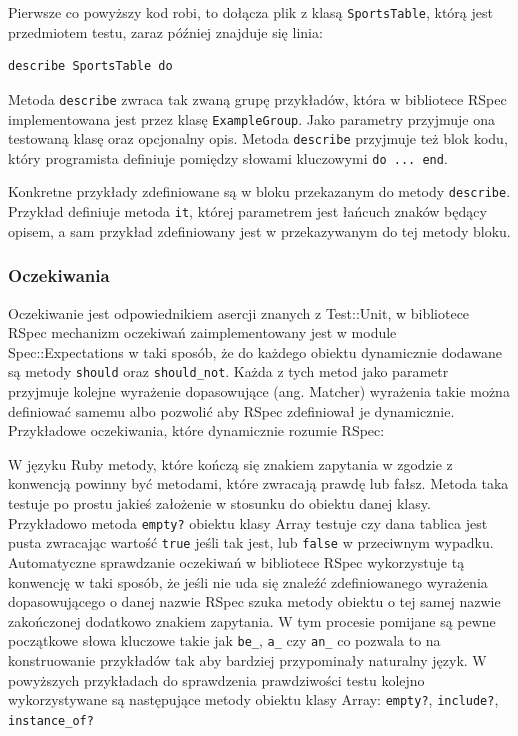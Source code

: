     
    
    Pierwsze co powyższy kod robi, to dołącza plik z klasą \texttt{SportsTable}, którą jest przedmiotem testu, zaraz później znajduje się linia:
    
\begin{lstlisting}
describe SportsTable do
\end{lstlisting}
    
    Metoda \texttt{describe} zwraca tak zwaną grupę przykładów, która w bibliotece RSpec implementowana jest przez klasę \texttt{ExampleGroup}. Jako parametry przyjmuje ona testowaną klasę oraz opcjonalny opis. Metoda \texttt{describe} przyjmuje też blok kodu, który programista definiuje pomiędzy słowami kluczowymi \texttt{do ... end}.
    
    Konkretne przykłady zdefiniowane są w bloku przekazanym do metody \texttt{describe}. Przykład definiuje metoda \texttt{it}, której parametrem jest łańcuch znaków będący opisem, a sam przykład zdefiniowany jest w przekazywanym do tej metody bloku.
    
    \subsubsection{Oczekiwania}
    Oczekiwanie jest odpowiednikiem asercji znanych z Test::Unit, w bibliotece RSpec mechanizm oczekiwań zaimplementowany jest w module Spec::Expectations w taki sposób, że do każdego obiektu dynamicznie dodawane są metody \texttt{should} oraz \texttt{should\_not}. Każda z tych metod jako parametr przyjmuje kolejne wyrażenie dopasowujące (ang. Matcher) wyrażenia takie można definiować samemu albo pozwolić aby RSpec zdefiniował je dynamicznie. Przykładowe oczekiwania, które dynamicznie rozumie RSpec:
    
    
    
    W języku Ruby metody, które kończą się znakiem zapytania w zgodzie z konwencją powinny być metodami, które zwracają prawdę lub fałsz. Metoda taka testuje po prostu jakieś założenie w stosunku do obiektu danej klasy. Przykładowo metoda \texttt{empty?} obiektu klasy Array testuje czy dana tablica jest pusta zwracając wartość \texttt{true} jeśli tak jest, lub \texttt{false} w przeciwnym wypadku. Automatyczne sprawdzanie oczekiwań w bibliotece RSpec wykorzystuje tą konwencję w taki sposób, że jeśli nie uda się znaleźć zdefiniowanego wyrażenia dopasowującego o danej nazwie RSpec szuka metody obiektu o tej samej nazwie zakończonej dodatkowo znakiem zapytania. W tym procesie pomijane są pewne początkowe słowa kluczowe takie jak \texttt{be\_}, \texttt{a\_} czy \texttt{an\_} co pozwala to na konstruowanie przykładów tak aby bardziej przypominały naturalny język. W powyższych przykładach do sprawdzenia prawdziwości testu kolejno wykorzystywane są następujące metody obiektu klasy Array: \verb+empty?+, \verb+include?+, \verb+instance_of?+
    
